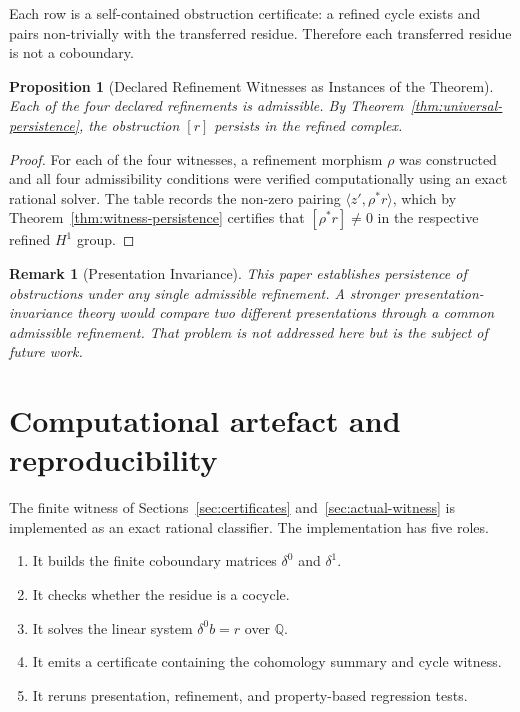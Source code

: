 \documentclass[11pt]{article}
\newtheorem{proposition}[theorem]{Proposition}
\newtheorem{remark}[theorem]{Remark}
\newcommand{\Q}{\mathbb{Q}}
\begin{document}
Each row is a self-contained obstruction certificate: a refined cycle exists and pairs non-trivially with the transferred residue. Therefore each transferred residue is not a coboundary.

\begin{proposition}[Declared Refinement Witnesses as Instances of the Theorem]
Each of the four declared refinements is admissible. By Theorem~\ref{thm:universal-persistence}, the obstruction \([r]\) persists in the refined complex.
\end{proposition}
\begin{proof}
For each of the four witnesses, a refinement morphism \(\rho\) was constructed and all four admissibility conditions were verified computationally using an exact rational solver. The table records the non-zero pairing \(\langle z', \rho^*r \rangle\), which by Theorem~\ref{thm:witness-persistence} certifies that \([\rho^*r] \neq 0\) in the respective refined \(H^1\) group.
\end{proof}

\begin{remark}[Presentation Invariance]
This paper establishes persistence of obstructions under any single admissible refinement. A stronger presentation-invariance theory would compare two different presentations through a common admissible refinement. That problem is not addressed here but is the subject of future work.
\end{remark}

\section{Computational artefact and reproducibility}
\label{sec:repro}

The finite witness of Sections~\ref{sec:certificates} and~\ref{sec:actual-witness} is implemented as an exact rational classifier. The implementation has five roles.

\begin{enumerate}[label=(\arabic*)]
\item It builds the finite coboundary matrices \(\delta^0\) and \(\delta^1\).
\item It checks whether the residue is a cocycle.
\item It solves the linear system \(\delta^0b=r\) over \(\Q\).
\item It emits a certificate containing the cohomology summary and cycle witness.
\item It reruns presentation, refinement, and property-based regression tests.
\end{enumerate}
\end{document}
